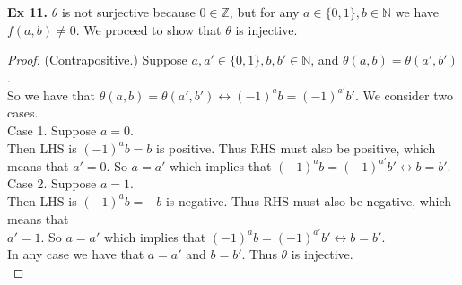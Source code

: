 \documentclass{article}
\begin{document}
\noindent \textbf{Ex 11.} $\theta$ is not surjective because $0 \in \mathbb{Z}$, but for any $a \in \{0,1\},b \in \mathbb{N}$ we have $f(a, b) \neq 0$. We proceed to show that $\theta$ is injective.
\begin{proof}
(Contrapositive.) Suppose $a, a' \in \{0,1\}, b, b' \in \mathbb{N}$, and $\theta(a, b)=\theta(a', b')$.\\
So we have that $\theta(a, b)=\theta(a', b') \leftrightarrow (-1)^ab=(-1)^{a'}b'$. We consider two cases.\\

\noindent Case 1. Suppose $a=0$.\\
\indent Then LHS is $(-1)^ab=b$ is positive. Thus RHS must also be positive, which means that $a'=0$. So \indent $a=a'$ which implies that $(-1)^ab=(-1)^{a'}b' \leftrightarrow b = b'$.\\

\noindent Case 2. Suppose $a=1$.\\
\indent Then LHS is $(-1)^ab=-b$ is negative. Thus RHS must also be negative, which means that\\\indent $a'=1$. So $a=a'$ which implies that $(-1)^ab=(-1)^{a'}b' \leftrightarrow b = b'$.\\

\noindent In any case we have that $a=a'$ and $b=b'$. Thus $\theta$ is injective.\\
\end{proof}

\newpage
\end{document}
